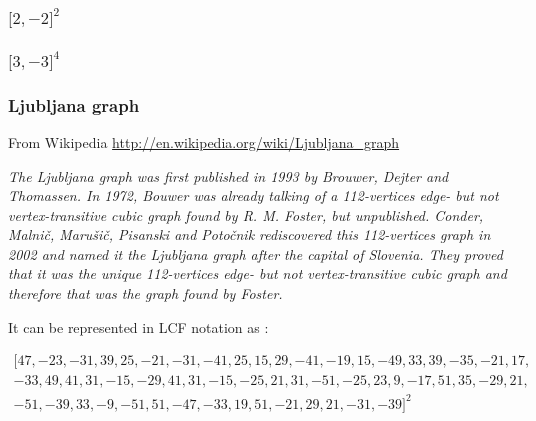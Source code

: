 \subsubsection{\texorpdfstring{$\big[2,-2\big]^2$}{}} 

\begin{center}
\begin{tkzexample}[vbox]
\end{tkzexample}
\end{center}


\subsubsection{\texorpdfstring{$\big[3,-3\big]^4$}{}} 

\begin{center}
\begin{tkzexample}[vbox]
\end{tkzexample}
\end{center}

\subsubsection{Ljubljana graph}
From Wikipedia \url{http://en.wikipedia.org/wiki/Ljubljana_graph}

\emph{The Ljubljana graph was first published in 1993 by Brouwer, Dejter and Thomassen.
In 1972, Bouwer was already talking of a 112-vertices edge- but not vertex-transitive cubic graph found by R. M. Foster, but unpublished. Conder, Malnič, Marušič, Pisanski and Potočnik rediscovered this 112-vertices graph in 2002 and named it the Ljubljana graph after the capital of Slovenia. They proved that it was the unique 112-vertices edge- but not vertex-transitive cubic graph and therefore that was the graph found by Foster.}

It can be   represented in LCF notation as  :

\[
\begin{array}{l}
\Big[ 47, -23, -31, 39, 25, -21, -31, -41, 25, 15, 29, -41, -19, 15, -49, 33, 39, -35, -21, 17,\\ -33, 49, 41, 31, -15, -29, 41, 31, -15, -25, 21, 31, -51, -25, 23, 9, -17, 51, 35, -29, 21,\\ -51, -39, 33, -9, -51, 51, -47, -33, 19, 51, -21,29, 21, -31, -39\Big]^2
\end{array}
\]


